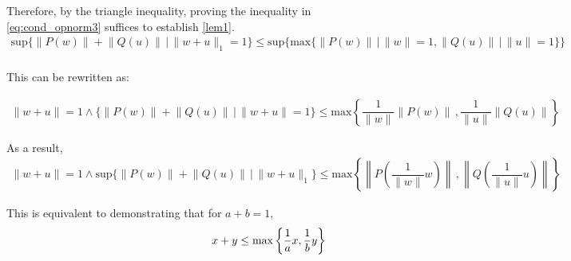 Therefore, by the triangle inequality, proving the inequality in \autoref{eq:cond_opnorm3} suffices to establish  \autoref{lem1}.
\begin{equation} \label{eq:cond_opnorm3}
  \begin{split}
  \text{sup}{\{ \lVert P (w)  \rVert + \lVert Q (u)  \rVert  \hspace{2pt} |  \hspace{2pt}  \lVert w+u \rVert_{1}=1  \}} \leq \text{sup} \{  \text{max} \{ \lVert P (w) \rVert  \hspace{2pt} |  \hspace{2pt}  \lVert w  \rVert =1, \lVert Q (u) \rVert  \hspace{2pt} |  \hspace{2pt}  \lVert u \rVert=1  \} \} \\
  \end{split}
\end{equation}


This can be rewritten as:

\begin{equation} 
  \begin{split}
  \lVert w + u   \rVert = 1 \wedge \{ \lVert P (w)  \rVert + \lVert Q (u)  \rVert  \hspace{2pt} |  \hspace{2pt}  \lVert w+u \rVert=1  \}  \leq \text{max}   \left\{ \dfrac{1}{\lVert w \rVert} \lVert P (w) \rVert  \hspace{2pt},  \dfrac{1}{\lVert u \rVert} \lVert Q (u) \rVert   \right\}
\end{split}
\end{equation}

As a result,
\begin{equation} 
  \begin{split}
  \lVert w + u   \rVert = 1 \wedge \text{sup}{\{ \lVert P (w)  \rVert + \lVert Q (u)  \rVert  \hspace{2pt} |  \hspace{2pt}  \lVert w+u \rVert_{1}  \}}  \leq \text{max}   \left\{  \left\lVert P \left( \dfrac{1}{\lVert w \rVert} w \right) \right\rVert  \hspace{2pt},  \left\lVert Q \left( \dfrac{1}{\lVert u \rVert} u \right) \right\rVert   \right\}
\end{split}
\end{equation}

This is equivalent to demonstrating that for $a+b=1$,
\begin{equation} 
\begin{split}
\hspace{110 pt}
    x + y  \leq  \max \left\{   \dfrac{1}{a}x  ,   \dfrac{1}{b} y   \right\} \\
\end{split}
\end{equation}

